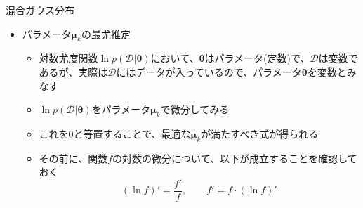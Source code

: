 \documentclass[dvipdfmx,notheorems,t]{beamer}
\begin{document}
\begin{frame}{混合ガウス分布}

\begin{itemize}
	\item パラメータ$\bm{\mu}_k$の最尤推定
	\begin{itemize}
		\item 対数尤度関数$\ln p(\mathcal{D} | \bm{\theta})$において、$\bm{\theta}$はパラメータ(定数)で、$\mathcal{D}$は変数であるが、実際は$\mathcal{D}$にはデータが入っているので、パラメータ$\bm{\theta}$を変数とみなす
		\newline
		\item $\ln p(\mathcal{D} | \bm{\theta})$をパラメータ$\bm{\mu}_k$で微分してみる
		\item これを$0$と等置することで、最適な$\bm{\mu}_k$が満たすべき式が得られる
		\newline
		\item その前に、関数$f$の対数の微分について、以下が成立することを確認しておく
		\begin{equation}
			(\ln f)' = \frac{f'}{f}, \qquad f' = f \cdot (\ln f)'
		\end{equation}
		

\end{itemize}
\end{itemize}
\end{frame}
\end{document}
